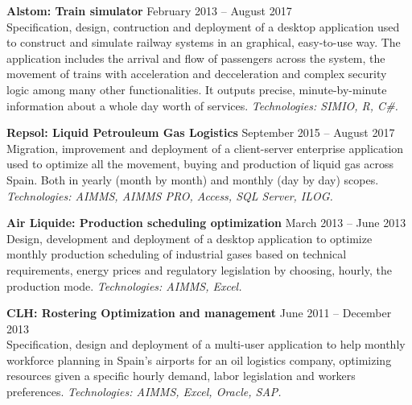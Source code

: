 \textbf{Alstom: Train simulator} 
	\hfill February 2013 -- August 2017\\
	Specification, design, contruction and deployment of a desktop application used to construct and simulate railway systems in an graphical, easy-to-use way. The application includes the arrival and flow of passengers across the system, the movement of trains with acceleration and decceleration and complex security logic among many other functionalities. It outputs precise, minute-by-minute information about a whole day worth of services.
	\textsl{Technologies: SIMIO, R, C\#.}

\textbf{Repsol: Liquid Petrouleum Gas Logistics} 
	\hfill September 2015 -- August 2017\\
	Migration, improvement and deployment of a client-server enterprise application used to optimize all the movement, buying and production of liquid gas across Spain. Both in yearly (month by month) and monthly (day by day) scopes.
	\textsl{Technologies: AIMMS, AIMMS PRO, Access, SQL Server, ILOG.}

\textbf{Air Liquide: Production scheduling optimization} 
	\hfill March 2013 -- June 2013\\
	Design, development and deployment of a desktop application to optimize monthly production scheduling of industrial gases based on technical requirements, energy prices and regulatory legislation by choosing, hourly, the production mode.
	\textsl{Technologies: AIMMS, Excel.}

\textbf{CLH: Rostering Optimization and management} 
	\hfill June 2011 -- December 2013\\
	Specification, design and deployment of a multi-user application to help monthly workforce planning in Spain's airports for an oil logistics company, optimizing resources given a specific hourly demand, labor legislation and workers preferences.
	\textsl{Technologies: AIMMS, Excel, Oracle, SAP.}


